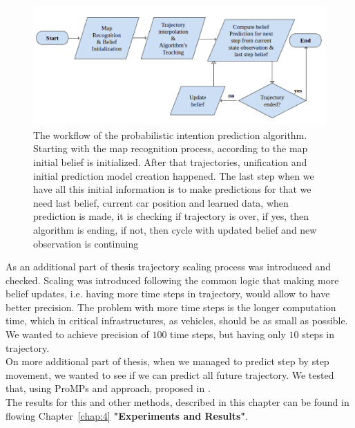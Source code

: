 \begin{figure}[H]
	\centering  	
	\includegraphics[width=13cm]{img/flow.png}
	\caption{The workflow of the probabilistic intention prediction algorithm. Starting with the map recognition process, according to the map initial belief is initialized. After that trajectories, unification and initial prediction model creation happened. The last step when we have all this initial information is to make predictions for that we need last belief, current car position and learned data, when prediction is made, it is checking if trajectory is over, if yes, then algorithm is ending, if not, then cycle with updated belief and new observation is continuing}
	\label{fig:flow}    
\end{figure}

As an additional part of thesis trajectory scaling process was introduced and checked. Scaling was introduced following the common logic that making more belief updates, i.e. having more time steps in trajectory, would allow to have better precision. The problem with more time steps is the longer computation time, which in critical infrastructures, as vehicles, should be as small as possible. We wanted to achieve precision of $100$ time steps, but having only $10$ steps in trajectory. \\
On more additional part of thesis, when we managed to predict step by step movement, we wanted to see if we can predict all future trajectory. We tested that, using \gls{ProMPs} and approach, proposed in \cite{ProMPs}. \\
The results for this and other methods, described in this chapter can be found in flowing Chapter~\ref{chap:4} \textbf{"Experiments and Results"}.




